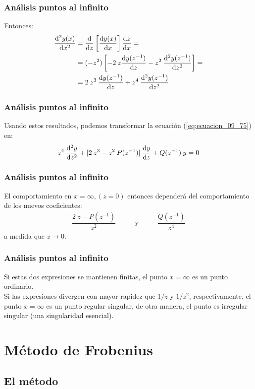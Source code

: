 \documentclass[12pt]{beamer}
\begin{document}
\begin{frame}
\frametitle{Análisis puntos al infinito}
Entonces:
\pause
\begin{align}
\begin{aligned}
\dv[2]{y(x)}{x} &= \dv{z} \left[ \dv{y(x)}{x} \right] \dv{z}{x} = \\
&= (-z^{2}) \left[ -2 \: z \dv{y(z^{-1})}{z} - z^{2} \: \dv[2]{y(z^{-1})}{z} \right] = \\
&= 2 \: z^{3} \: \dv{y(z^{-1})}{z} + z^{4} \: \dv[2]{y(z^{-1})}{z}
\end{aligned}
\label{eq:ecuacion_09_77}
\end{align}
\end{frame}
\begin{frame}
\frametitle{Análisis puntos al infinito}
Usando estos resultados, podemos transformar la ecuación (\ref{eq:ecuacion_09_75}) en:
\pause
\begin{align}
z^{4} \: \dv[2]{y}{z} + [ 2 \: z^{3} - z^{2} \: P (z^{-1})] \: \dv{y}{z} + Q (z^{-1}) \: y = 0
\label{eq:ecuacion_09_78}
\end{align}
\end{frame}
\begin{frame}
\frametitle{Análisis puntos al infinito}
El comportamiento en $x = \infty, (z = 0)$ entonces dependerá del comportamiento de los nuevos coeficientes:
\pause
\begin{align*}
\dfrac{2 \: z - P(z^{-1})}{z^{2}} \hspace{1cm} \text{ y } \hspace{1cm} \dfrac{Q(z^{-1})}{z^{4}}
\end{align*}
a medida que $z \to 0$.
\end{frame}
\begin{frame}
\frametitle{Análisis puntos al infinito}
Si estas dos expresiones se mantienen finitas, el punto $x = \infty$ es un punto ordinario.
\\
\bigskip
\pause
Si las expresiones divergen con mayor rapidez que $1/z$ y $1/z^{2}$, respectivamente, el punto $x = \infty$ es un punto regular singular, de otra manera, el punto es irregular singular (una singularidad esencial).
\end{frame}

\section{Método de Frobenius}
\subsection{El método}
\end{document}
